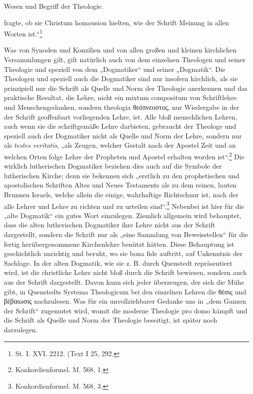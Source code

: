\setcounter{footnote}{410}
 \hfill Wesen und Begriff der Theologie.

\bigskip

fragte, ob sie Christum homousion hielten, wie der Schrift Meinung in allen Worten ist.“\footnote{St. I. XVI. 2212. (Text I 25, 292.}

Was von Synoden und Konzilien und von allen großen und kleinen kirchlichen Versammlungen gilt, gilt natürlich auch von dem einzelnen Theologen und seiner Theologie und speziell von dem „Dogmatiker“ und seiner „Dogmatik“. Die Theologen und speziell auch die Dogmatiker sind nur insofern kirchlich, als sie prinzipiell nur die Schrift als Quelle und Norm der Theologie anerkennen und das praktische Resultat, die Lehre, nicht ein mixtum compositum von Schriftlehre und Menschengedanken, sondern theologia \textgreek{θεόπνευστος}, nur Wiedergabe in der der Schrift geoffenbart vorliegenden Lehre, ist. Alle bloß menschlichen Lehren, auch wenn sie die schriftgemäße Lehre darbieten, gebraucht der Theologe und speziell auch der Dogmatiker nicht als Quelle und Norm der Lehre, sondern nur als \textit{testes veritatis}, „als Zeugen, welcher Gestalt nach der Apostel Zeit und an welchen Orten folge Lehre der Propheten und Apostel erhalten worden ist“.\footnote{Konkordienformel. M. 568, 1.} Die wirklich lutherischen Dogmatiker beziehen dies auch auf die Symbole der lutherischen Kirche; denn sie bekennen sich „erstlich zu den prophetischen und apostolischen Schriften Altes und Neues Testaments als zu dem reinen, lauten Brunnen Israels, welche allein die einige, wahrhaftige Richtschnur ist, nach der alle Lehrer und Lehre zu richten und zu urteilen sind“.\footnote{Konkordienformel. M. 568, 3.} Nebenbei ist hier für die „alte Dogmatik“ ein gutes Wort einzulegen. Ziemlich allgemein wird behauptet, dass die alten lutherischen Dogmatiker ihre Lehre nicht aus der Schrift dargestellt, sondern die Schrift nur als „eine Sammlung von Beweisstellen“ für die fertig herübergenommene Kirchenlehre benützt hätten. Diese Behauptung ist geschichtlich unrichtig und beruht, wo sie bona fide auftritt, auf Unkenntnis der Sachlage. In der alten Dogmatik, wie sie z. B. durch Quenstedt repräsentiert wird, ist die christliche Lehre nicht bloß durch die Schrift bewiesen, sondern auch aus der Schrift dargestellt. Davon kann sich jeder überzeugen, der sich die Mühe gibt, in Quenstedts Systema Theologicum bei den einzelnen Lehren die \textgreek{θέσις} und \textgreek{βέβαιωσις} nachzulesen. Was für ein unvollziehbarer Gedanke uns in „dem Ganzen der Schrift“ zugemutet wird, womit die moderne Theologie pro domo kämpft und die Schrift als Quelle und Norm der Theologie beseitigt, ist später noch darzulegen.